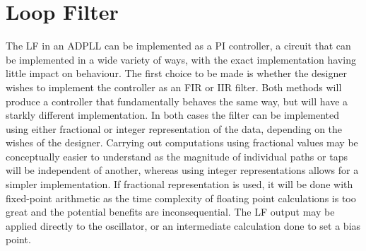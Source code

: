 \section{Loop Filter}
The \acl{LF} in an \ac{ADPLL} can be implemented as a \ac{PI} controller, a circuit that can be implemented in a wide variety of ways, with the exact implementation having little impact on behaviour. The first choice to be made is whether the designer wishes to implement the controller as an \ac{FIR} or \ac{IIR} filter. Both methods will produce a controller that fundamentally behaves the same way, but will have a starkly different implementation. In both cases the filter can be implemented using either fractional or integer representation of the data, depending on the wishes of the designer. Carrying out computations using fractional values may be conceptually easier to understand as the magnitude of individual paths or taps will be independent of another, whereas using integer representations allows for a simpler implementation. If fractional representation is used, it will be done with fixed-point arithmetic as the time complexity of floating point calculations is too great and the potential benefits are inconsequential. The \acl{LF} output may be applied directly to the oscillator, or an intermediate calculation done to set a bias point.

